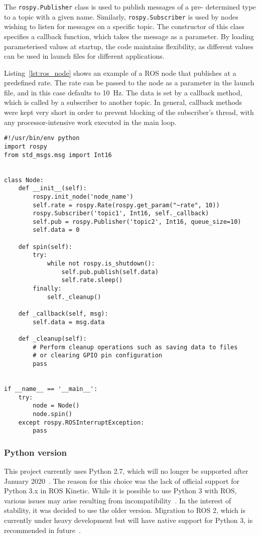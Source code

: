 The \verb|rospy.Publisher| class is used to publish messages of a pre-
determined type to a topic with a given name. Similarly,
\verb|rospy.Subscriber| is used by nodes wishing to listen for messages on
a specific topic. The constructor of this class specifies a callback
function, which takes the message as a parameter. By loading parameterised
values at startup, the code maintains flexibility, as different values can
be used in launch files for different applications.

Listing~\ref{lst:ros_node} shows an example of a ROS node that publishes
at a predefined rate. The rate can be passed to the node as a parameter in
the launch file, and in this case defaults to \SI{10}{\Hz}. The data is
set by a callback method, which is called by a subscriber to another
topic. In general, callback methods were kept very short in order to
prevent blocking of the subscriber's thread, with any processor-intensive
work executed in the main loop.

\begin{lstlisting}[caption={Example ROS node}, label={lst:ros_node}]
#!/usr/bin/env python
import rospy
from std_msgs.msg import Int16


class Node:
    def __init__(self):
        rospy.init_node('node_name')
        self.rate = rospy.Rate(rospy.get_param("~rate", 10))
        rospy.Subscriber('topic1', Int16, self._callback)
        self.pub = rospy.Publisher('topic2', Int16, queue_size=10)
        self.data = 0

    def spin(self):
        try:
            while not rospy.is_shutdown():
                self.pub.publish(self.data)
                self.rate.sleep()
        finally:
            self._cleanup()

    def _callback(self, msg):
        self.data = msg.data

    def _cleanup(self):
        # Perform cleanup operations such as saving data to files
        # or clearing GPIO pin configuration
        pass


if __name__ == '__main__':
    try:
        node = Node()
        node.spin()
    except rospy.ROSInterruptException:
        pass
\end{lstlisting}


\subsubsection{Python version}
This project currently uses Python 2.7, which will no longer be supported
after January 2020~\cite{python2-eol}. The reason for this choice was the
lack of official support for Python 3.x in ROS Kinetic. While it is
possible to use Python 3 with ROS, various issues may arise resulting from
incompatibility~\cite{medium-ros-python3}. In the interest of stability,
it was decided to use the older version. Migration to ROS 2, which is
currently under heavy development but will have native support for Python
3, is recommended in future~\cite{ros2}.

